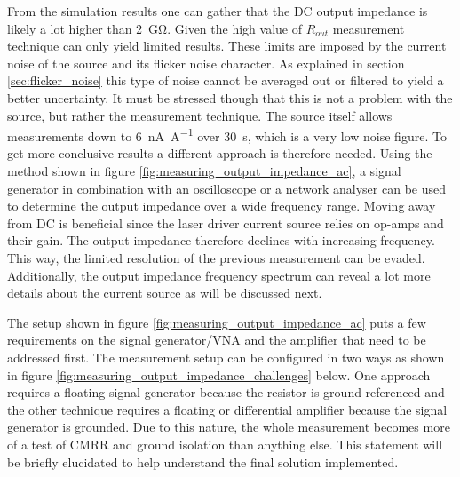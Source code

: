From the simulation results one can gather that the DC output impedance is likely a lot higher than \qty{2}{\giga\ohm}. Given the high value of $R_{out}$ measurement technique can only yield limited results. These limits are imposed by the current noise of the source and its flicker noise character. As explained in section \ref{sec:flicker_noise} this type of noise cannot be averaged out or filtered to yield a better uncertainty. It must be stressed though that this is not a problem with the source, but rather the measurement technique. The source itself allows measurements down to \qty{6}{\nA \per \A} over \qty{30}{\second}, which is a very low noise figure. To get more conclusive results a different approach is therefore needed. Using the method shown in figure \ref{fig:measuring_output_impedance_ac}, a signal generator in combination with an oscilloscope or a network analyser can be used to determine the output impedance over a wide frequency range. Moving away from DC is beneficial since the laser driver current source relies on op-amps and their gain. The output impedance therefore declines with increasing frequency. This way, the limited resolution of the previous measurement can be evaded. Additionally, the output impedance frequency spectrum can reveal a lot more details about the current source as will be discussed next.

The setup shown in figure \ref{fig:measuring_output_impedance_ac} puts a few requirements on the signal generator/VNA and the amplifier that need to be addressed first. The measurement setup can be configured in two ways as shown in figure \ref{fig:measuring_output_impedance_challenges} below. One approach requires a floating signal generator because the resistor is ground referenced and the other technique requires a floating or differential amplifier because the signal generator is grounded. Due to this nature, the whole measurement becomes more of a test of CMRR and ground isolation than anything else. This statement will be briefly elucidated to help understand the final solution implemented.

